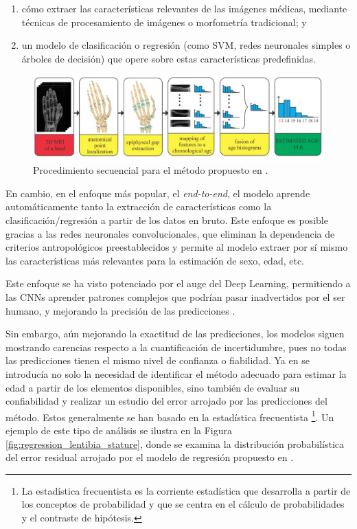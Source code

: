 \begin{enumerate}

    \item cómo extraer las características relevantes de las imágenes médicas, mediante técnicas de procesamiento de 
    imágenes o morfometría tradicional; y
    
    \item un modelo de clasificación o regresión (como SVM, redes neuronales simples o árboles de decisión) 
    que opere sobre estas características predefinidas.

\end{enumerate}

\begin{figure}[h]
    \centering
    \includegraphics[width=\textwidth]{capitulos/cap_01/imagenes/MRI_pipeline.png}
    \caption{Procedimiento secuencial para el método propuesto en \cite{stern2014}.} 
    \label{fig:MRI_pipeline}
\end{figure}

En cambio, en el enfoque más popular, el \textit{end-to-end}, el modelo aprende automáticamente tanto la 
extracción de características como la clasificación/regresión a partir de los datos en bruto. Este enfoque es 
posible gracias a las redes neuronales convolucionales, que eliminan la dependencia de criterios 
antropológicos preestablecidos y permite al modelo extraer por sí mismo las características más relevantes 
para la estimación de sexo, edad, etc. 

Este enfoque se ha visto potenciado por el auge del Deep Learning, permitiendo a las CNNs aprender patrones 
complejos que podrían pasar inadvertidos por el ser humano, y mejorando la precisión de las predicciones 
\cite{stern2019, venema2022}.

Sin embargo, aún mejorando la exactitud de las predicciones, los modelos siguen mostrando carencias respecto a 
la cuantificación de incertidumbre, pues no todas las predicciones tienen el mismo nivel de confianza o 
fiabilidad. Ya en \cite{ferrante2009} se introducía no solo la necesidad de identificar el método adecuado 
para estimar la edad a partir de los elementos disponibles, sino también de evaluar su confiabilidad y 
realizar un estudio del error arrojado por las predicciones del método. Estos generalmente se han basado en 
la estadística frecuentista \cite{verma2020, stepanovsky2024, heinrich2024}
\footnote{
    La estadística frecuentista es la corriente estadística que desarrolla a partir de los conceptos de 
    probabilidad y que se centra en el cálculo de probabilidades y el contraste de hipótesis.
}.
Un ejemplo de este tipo de análisis se ilustra en la Figura \ref{fig:regression_lentibia_stature}, donde se 
examina la distribución probabilística del error residual arrojado por el modelo de regresión propuesto en 
\cite{verma2020}.

